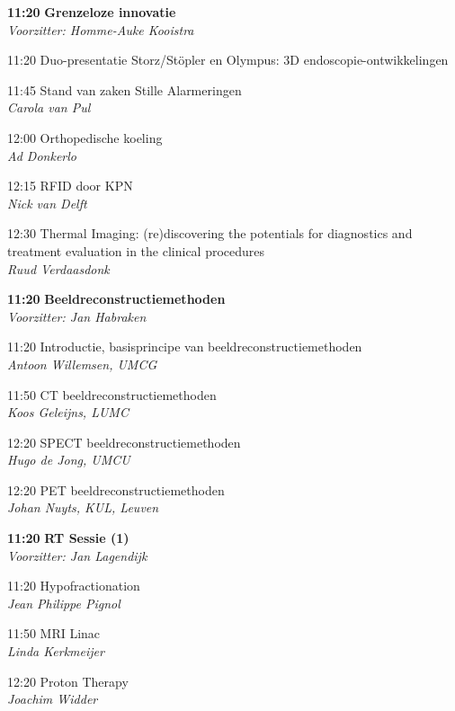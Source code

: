 \documentclass[a4paper,10pt]{report}
\begin{document}
\begin{multicols*}{3}
\vfill
{}
\begin{packed_enum}
\item[\textbf{11:20}]\textbf{Grenzeloze innovatie}\\\textit{Voorzitter: Homme-Auke Kooistra}
\item[11:20] Duo-presentatie Storz/St\"opler en Olympus: 3D endo\-sco\-pie-ontwikkelingen
\item[11:45] Stand van zaken Stille Alarmeringen\\\textit{Carola van Pul}
\item[12:00] Orthopedische koeling\\\textit{Ad Donkerlo}
\item[12:15] RFID door KPN\\\textit{Nick van Delft}
\item[12:30] Thermal Imaging: (re)discovering the potentials for diag\-nostics and treatment evaluation in the clinical procedures\\\textit{Ruud Verdaasdonk}
\end{packed_enum}
\columnbreak

\begin{packed_enum}
\item[\textbf{11:20}]\textbf{Beeldreconstructiemethoden}\\\textit{Voorzitter: Jan Habraken}
\item[11:20] Introductie, basisprincipe van beeldreconstructiemethoden\\\textit{Antoon Willemsen, UMCG}
\item[11:50] CT beeldreconstructiemethoden\\\textit{Koos Geleijns, LUMC}
\item[12:20] SPECT beeldreconstructiemethoden\\\textit{Hugo de Jong, UMCU}
\item[12:20] PET beeldreconstructiemethoden\\\textit{Johan Nuyts, KUL, Leuven}
\end{packed_enum}

\begin{packed_enum}
\item[\textbf{11:20}]{\textbf{RT Sessie (1)}}\\\textit{Voorzitter: Jan Lagendijk}
\item[11:20] Hypofractionation\\\textit{Jean Philippe Pignol}
\item[11:50] MRI Linac\\\textit{Linda Kerkmeijer}
\item[12:20] Proton Therapy\\\textit{Joachim Widder}
\end{packed_enum}


\end{multicols*}
\end{document}
